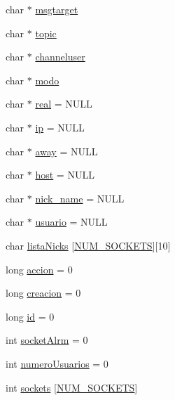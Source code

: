 \begin{DoxyCompactItemize}
\item 
char $\ast$ \hyperlink{_g-2361-06-_p1-_server_8c_a968dcc7e43caeca7959f3c069dcccc6a}{msgtarget}
\item 
char $\ast$ \hyperlink{_g-2361-06-_p1-_server_8c_affecb48e716753e10b44feac31f12529}{topic}
\item 
char $\ast$ \hyperlink{_g-2361-06-_p1-_server_8c_a55a7bd8f3229706c5917445aba995c5b}{channeluser}
\item 
char $\ast$ \hyperlink{_g-2361-06-_p1-_server_8c_a7451f0d59207b53af6178219fcf62677}{modo}
\item 
char $\ast$ \hyperlink{_g-2361-06-_p1-_server_8c_af832f551e1c343666c3d2a55834139a0}{real} = N\+U\+L\+L
\item 
char $\ast$ \hyperlink{_g-2361-06-_p1-_server_8c_afbc356cd0e25d1dbbece7c10fd025fa6}{ip} = N\+U\+L\+L
\item 
char $\ast$ \hyperlink{_g-2361-06-_p1-_server_8c_adf86742e21384f58f8999d8317e6a370}{away} = N\+U\+L\+L
\item 
char $\ast$ \hyperlink{_g-2361-06-_p1-_server_8c_a1c2046dcb30a629d6d9f45ff8f403f12}{host} = N\+U\+L\+L
\item 
char $\ast$ \hyperlink{_g-2361-06-_p1-_server_8c_aabbf66718cda228b924a4a9441eadf62}{nick\+\_\+name} = N\+U\+L\+L
\item 
char $\ast$ \hyperlink{_g-2361-06-_p1-_server_8c_a0147a5b81499984f9cb00379a8cb84af}{usuario} = N\+U\+L\+L
\item 
char \hyperlink{_g-2361-06-_p1-_server_8c_a713172366a6be2fbf8456a4b43702603}{lista\+Nicks} \mbox{[}\hyperlink{_g-2361-06-_p1-_sockets_8h_a1c803e4ececfb47d2791c9283c85eb00}{N\+U\+M\+\_\+\+S\+O\+C\+K\+E\+T\+S}\mbox{]}\mbox{[}10\mbox{]}
\item 
long \hyperlink{_g-2361-06-_p1-_server_8c_a93e785c991445d8b8ee99c2e51242d5a}{accion} = 0
\item 
long \hyperlink{_g-2361-06-_p1-_server_8c_a26292066ca0d17922eadee4161542ab9}{creacion} = 0
\item 
long \hyperlink{_g-2361-06-_p1-_server_8c_a7350fbd6ad10618f3b750b1f99ca5c3c}{id} = 0
\item 
int \hyperlink{_g-2361-06-_p1-_server_8c_a882bc4c5a2b02dd85d4716961c4d902f}{socket\+Alrm} = 0
\item 
int \hyperlink{_g-2361-06-_p1-_server_8c_ac9a5ec6f534d2a8e2a870179807d32dc}{numero\+Usuarios} = 0
\item 
int \hyperlink{_g-2361-06-_p1-_server_8c_a7724e53f22e431d1ecb6516951a172e1}{sockets} \mbox{[}\hyperlink{_g-2361-06-_p1-_sockets_8h_a1c803e4ececfb47d2791c9283c85eb00}{N\+U\+M\+\_\+\+S\+O\+C\+K\+E\+T\+S}\mbox{]}
\end{DoxyCompactItemize}


